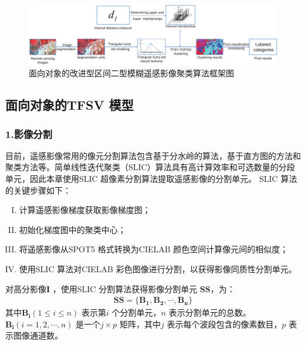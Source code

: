 \begin{figure}[htb]
    \centering
    \includegraphics[width=1.0\textwidth]{figures/framework}
    \caption{面向对象的改进型区间二型模糊遥感影像聚类算法框架图}
    \label{fig:framework}
\end{figure}


\subsection{面向对象的TFSV 模型}
\label{subsec::chap03-3-1}

\subsubsection*{1.影像分割}
\label{subsec::chap03-3-1-1}

目前，遥感影像常用的像元分割算法包含基于分水岭的算法，基于直方图的方法和聚类方法等\cite{roerdink2000watershed}。简单线性迭代聚类（SLIC）算法具有高计算效率和可选数量的分段单元\cite{achanta2012slic}，因此本章使用SLIC 超像素分割算法提取遥感影像的分割单元。 SLIC 算法的关键步骤如下：
\begin{enumerate}[(I)]
    \item 计算遥感影像梯度获取影像梯度图；
    \item 初始化梯度图中的聚类中心；
    \item 将遥感影像从SPOT5 格式转换为CIELAB 颜色空间计算像元间的相似度；
    \item 使用SLIC 算法对CIELAB 彩色图像进行分割，以获得影像同质性分割单元。
\end{enumerate}

对高分影像$\bm{I}$ ，使用SLIC 分割算法获得影像分割单元 $\bm{SS}$，为：
\begin{equation}\label{eq:image_ss}
    \begin{split}
        \bm{SS} = \lbrace \bm{B_1}, \bm{B_2},\bm{\cdots}, \bm{B_n} \rbrace
    \end{split}
\end{equation}
其中$\bm{B_i}(1 \leq i \leq n)$ 表示第$i$ 个分割单元，$n$ 表示分割单元的总数。 $\bm{B_i}(i=1,2,\cdots, n)$ 是一个$j \times p$ 矩阵，其中$j$ 表示每个波段包含的像素数目，$p$ 表示图像通道数。


